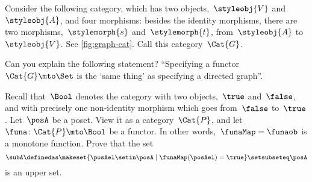 \begin{gradedexercise}
    \label{ex:GraphsViaFunctors}
    Consider the following category, which has two objects,~$\styleobj{V}$ and~$\styleobj{A}$, and four morphisms: besides the identity morphisms, there are two morphisms,~$\stylemorph{s}$ and~$\stylemorph{t}$, from~$\styleobj{A}$ to~$\styleobj{V}$.
    See \cref{fig:graph-cat}.
    Call this category~$\Cat{G}$.

    Can you explain the following statement?
    ``Specifying a functor~$\Cat{G} \mto \Set$ is the `same thing' as specifying a directed graph''.
\end{gradedexercise}

\begin{marginfigure}
    \centering
    \caption{}
    \label{fig:graph-cat}
\end{marginfigure}

\begin{gradedexercise}
    \label{ex:UpperSetsViaFunctors}
    Recall that~$\Bool$ denotes the category with two objects,~$\true$ and~$\false$, and with precisely one non-identity morphism which goes from~$\false$ to~$\true$.
    Let~$\posA$ be a poset.
    View it as a category~$\Cat{P}$, and let~$\funa \colon \Cat{P} \mto \Bool$ be a functor.
    In other words,~$\funaMap = \funaob$ is a monotone function.
    Prove that the set
    \begin{equation}
        \subA \definedas \makeset{ \posAel \setin \posA \mid \funaMap(\posAel) = \true } \setsubseteq \posA
    \end{equation}
    is an upper set.
\end{gradedexercise}

